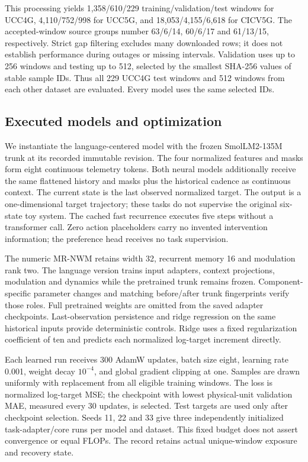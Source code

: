This processing yields 1,358/610/229 training/validation/test windows for
UCC4G, 4,110/752/998 for UCC5G, and 18,053/4,155/6,618 for CICV5G.
The accepted-window source groups number 63/6/14, 60/6/17 and 61/13/15,
respectively. Strict gap filtering excludes many downloaded rows; it does
not establish performance during outages or missing intervals.
Validation uses up to 256 windows and testing up to 512, selected by the
smallest SHA-256 values of stable sample IDs. Thus all 229 UCC4G test
windows and 512 windows from each other dataset are evaluated. Every
model uses the same selected IDs.

\subsection{Executed models and optimization}
We instantiate the language-centered model with the frozen
SmolLM2-135M~\cite{smollm2} trunk at its recorded immutable revision.
The four normalized features and masks form eight continuous telemetry
tokens. Both neural models additionally receive the same flattened history
and masks plus the historical cadence as continuous context. The current
state is the last observed normalized target. The output is a one-dimensional
target trajectory; these tasks do not supervise the original six-state toy
system. The cached fast recurrence executes five steps without a transformer
call. Zero action placeholders carry no invented intervention information;
the preference head receives no task supervision.

The numeric MR-NWM retains width 32, recurrent memory 16 and modulation
rank two. The language version trains input adapters, context projections,
modulation and dynamics while the pretrained trunk remains frozen.
Component-specific parameter changes and matching before/after trunk
fingerprints verify those roles. Full pretrained weights are omitted from
the saved adapter checkpoints. Last-observation persistence and ridge
regression on the same historical inputs provide deterministic controls.
Ridge uses a fixed regularization coefficient of ten and predicts each
normalized log-target increment directly.

Each learned run receives 300 AdamW updates, batch size eight, learning
rate 0.001, weight decay $10^{-4}$, and global gradient clipping at one.
Samples are drawn uniformly with replacement from all eligible training
windows. The loss is normalized log-target MSE; the checkpoint with lowest
physical-unit validation MAE, measured every 30 updates, is selected.
Test targets are used only after checkpoint selection. Seeds 11, 22 and
33 give three independently initialized task-adapter/core runs per model
and dataset. This fixed budget does not assert convergence or equal FLOPs.
The record retains actual unique-window exposure and recovery state.

